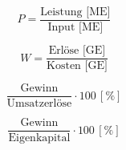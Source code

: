 
\noindent
\begin{minipage}[t]{0.48\textwidth}
\[ P = \dfrac{\text{Leistung [ME]}}{\text{Input [ME]}} \]
\end{minipage}%
\hfill
\begin{minipage}[t]{0.48\textwidth}
\[ W = \dfrac{\text{Erlöse [GE]}}{\text{Kosten [GE]}} \]
\end{minipage}

\noindent
\begin{minipage}[t]{0.48\textwidth}
\[ \dfrac{\text{Gewinn}}{\text{Umsatzerlöse}} \cdot 100\,[\%] \]
\end{minipage}%
\hfill
\begin{minipage}[t]{0.48\textwidth}
\[ \dfrac{\text{Gewinn}}{\text{Eigenkapital}} \cdot 100\,[\%] \]
\end{minipage}
